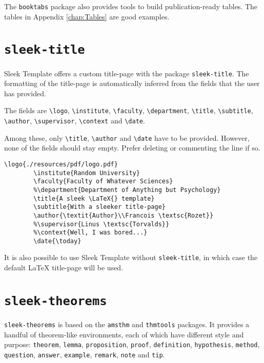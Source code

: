 \documentclass[a4paper, 12pt]{report}
\def\tbs{\textbackslash}
\begin{document}
    The \texttt{booktabs} package also provides tools to build publication-ready tables. The tables in Appendix \ref{chap:Tables} are good examples.

    \newpage

    \section{\texttt{sleek-title}}

    Sleek Template offers a custom title-page with the package \texttt{sleek-title}. The formatting of the title-page is automatically inferred from the fields that the user has provided.

    The fields are \texttt{\tbs{}logo}, \texttt{\tbs{}institute}, \texttt{\tbs{}faculty}, \texttt{\tbs{}department}, \texttt{\tbs{}title}, \texttt{\tbs{}subtitle}, \texttt{\tbs{}author}, \texttt{\tbs{}supervisor}, \texttt{\tbs{}context} and \texttt{\tbs{}date}.

    Among these, only \texttt{\tbs{}title}, \texttt{\tbs{}author} and \texttt{\tbs{}date} have to be provided. However, none of the fields should stay empty. Prefer deleting or commenting the line if so.

    \begin{lstlisting}[style=latexFrameTB, caption={Example of \texttt{sleek-title} title-page definition.}, gobble=8]
        \logo{./resources/pdf/logo.pdf}
        \institute{Random University}
        \faculty{Faculty of Whatever Sciences}
        %\department{Department of Anything but Psychology}
        \title{A sleek \LaTeX{} template}
        \subtitle{With a sleeker title-page}
        \author{\textit{Author}\\Francois \textsc{Rozet}}
        %\supervisor{Linus \textsc{Torvalds}}
        %\context{Well, I was bored...}
        \date{\today}
    \end{lstlisting}

    It is also possible to use Sleek Template without \texttt{sleek-title}, in which case the default \LaTeX{} title-page will be used.

    \newpage

    \section{\texttt{sleek-theorems}}

    \texttt{sleek-theorems} is based on the \texttt{amsthm} and \texttt{thmtools} packages. It provides a handful of theorem-like environments, each of which have different style and purpose: \texttt{theorem}, \texttt{lemma}, \texttt{proposition}, \texttt{proof}, \texttt{definition}, \texttt{hypothesis}, \texttt{method}, \texttt{question}, \texttt{answer}, \texttt{example}, \texttt{remark}, \texttt{note} and \texttt{tip}.
\end{document}
